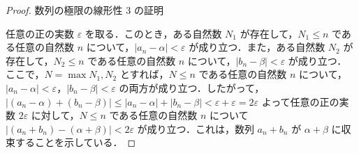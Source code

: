 \documentclass[a4paper]{ltjsarticle}
\begin{document}
\begin{proof}{数列の極限の線形性 3 の証明}{}

任意の正の実数 $\varepsilon$ を取る．このとき，ある自然数 $N_1$ が存在して，$N_1 \leq n$ である任意の自然数 $n$ について，$|a_n - \alpha| < \varepsilon$ が成り立つ．また，ある自然数 $N_2$ が存在して，$N_2 \leq n$ である任意の自然数 $n$ について，$|b_n - \beta| < \varepsilon$ が成り立つ．
\\
ここで，$N = \max {N_1, N_2}$ とすれば，$N \leq n$ である任意の自然数 $n$ について，$|a_n - \alpha| < \varepsilon，|b_n - \beta| < \varepsilon$ の両方が成り立つ．したがって，$|(a_n - \alpha) + (b_n - \beta)| \leq |a_n - \alpha| + |b_n - \beta| < \varepsilon + \varepsilon = 2\varepsilon$ よって任意の正の実数 $2\varepsilon$ に対して，$N \leq n$ である任意の自然数 $n$ について $|(a_n + b_n) - (\alpha + \beta)| < 2\varepsilon$ が成り立つ．これは，数列 ${a_n + b_n}$ が $\alpha + \beta$ に収束することを示している．

\end{proof}
\end{document}
